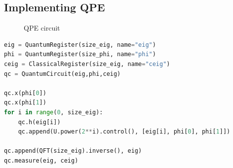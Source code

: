 \documentclass{article}
\theoremstyle{plain}
\begin{document}
  \newpage
  \subsection{Implementing QPE}

  \begin{figure}[!htb]
    \begin{center}
    \end{center}
    \caption{QPE circuit}\label{fig:qpe}
  \end{figure}

  \begin{lstlisting}[language=python, label=cpe_code,
                     caption=Code that generate the QPE circuit]
eig = QuantumRegister(size_eig, name="eig")
phi = QuantumRegister(size_phi, name="phi")
ceig = ClassicalRegister(size_eig, name="ceig")
qc = QuantumCircuit(eig,phi,ceig)

qc.x(phi[0])
qc.x(phi[1])
for i in range(0, size_eig):
    qc.h(eig[i])
    qc.append(U.power(2**i).control(), [eig[i], phi[0], phi[1]])

qc.append(QFT(size_eig).inverse(), eig)
qc.measure(eig, ceig)\end{lstlisting}
\end{document}
